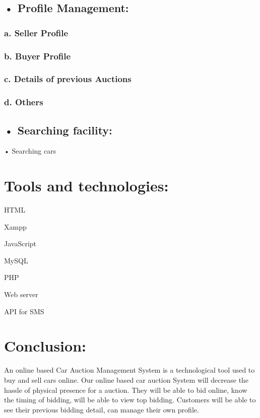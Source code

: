 \documentclass{report}
\begin{document}
\subsection*{• Profile Management:} 


\subsubsection*{a. Seller Profile}

\subsubsection*{b. Buyer Profile}

\subsubsection*{c. Details of previous Auctions}

\subsubsection*{d. Others}


\subsection*{• Searching facility:} 

• Searching cars

\section*{Tools and technologies:}

	HTML
	
	Xampp
	
	JavaScript
	
	MySQL
	
	PHP
	
	Web server
	
	API for SMS

\section*{Conclusion:}

An online based Car Auction Management System is a technological tool used to buy and sell cars online. Our online based car auction System will decrease the hassle of physical presence for a auction. They will be able to bid online, know the timing of bidding, will be able to view top bidding. Customers will be able to see their previous bidding detail, can manage their own profile. 
\end{document}
